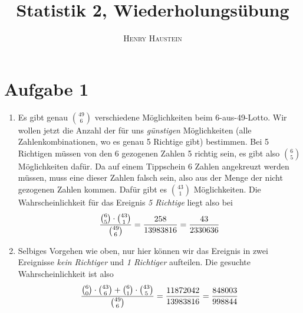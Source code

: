 \documentclass{article}
\title{\textbf{Statistik 2, Wiederholungsübung}}
\author{\textsc{Henry Haustein}}
\date{}
\begin{document}
	\maketitle
	
	\section*{Aufgabe 1}
	\begin{enumerate}[label=(\alph*)]
		\item Es gibt genau $\binom{49}{6}$ verschiedene Möglichkeiten beim 6-aus-49-Lotto. Wir wollen jetzt die Anzahl der für uns \textit{günstigen} Möglichkeiten (alle Zahlenkombinationen, wo es genau 5 Richtige gibt) bestimmen. Bei 5 Richtigen müssen von den 6 gezogenen Zahlen 5 richtig sein, es gibt also $\binom{6}{5}$ Möglichkeiten dafür. Da auf einem Tippschein 6 Zahlen angekreuzt werden müssen, muss eine dieser Zahlen falsch sein, also aus der Menge der nicht gezogenen Zahlen kommen. Dafür gibt es $\binom{43}{1}$ Möglichkeiten. Die Wahrscheinlichkeit für das Ereignis \textit{5 Richtige} liegt also bei
		\begin{align}
			\frac{\binom{6}{5}\cdot\binom{43}{1}}{\binom{49}{6}} = \frac{258}{13983816} = \frac{43}{2330636} \notag
		\end{align}
		\item Selbiges Vorgehen wie oben, nur hier können wir das Ereignis in zwei Ereignisse \textit{kein Richtiger} und \textit{1 Richtiger} aufteilen. Die gesuchte Wahrscheinlichkeit ist also
		\begin{align}
			\frac{\binom{6}{0}\cdot\binom{43}{6} + \binom{6}{1}\cdot\binom{43}{5}}{\binom{49}{6}} = \frac{11872042}{13983816} = \frac{848003}{998844} \notag
		\end{align}
	\end{enumerate}
	
\end{document}
